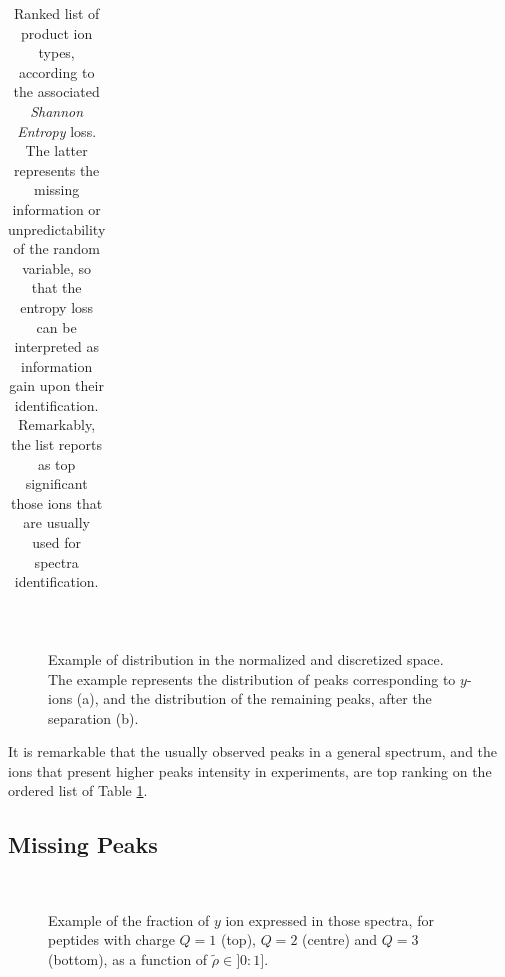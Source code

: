 \begin{table}
\begin{center}
\begin{tabular}{crlrlrl}
\hline \hline
\end{tabular}
\caption{\label{tab:list}
Ranked list of product ion types, according to the associated \emph{Shannon
Entropy} loss. The latter represents the missing information or unpredictability of
the random variable, so that the entropy loss can be interpreted as information gain upon their identification. 
Remarkably, the list reports as top significant those ions that are usually used for spectra identification.
}
\end{center}
\end{table}

\begin{figure}[!thb]
\begin{center}
\subfigure[matched]{
\resizebox{0.45\textwidth}{!}{\sffamily}}
\subfigure[unmatched]{
\resizebox{0.45\textwidth}{!}{\sffamily}}\\
\caption{\label{fig:dist-ex}
Example of distribution in the normalized and discretized space. The example represents
the distribution of peaks corresponding to $y$-ions (a), and the distribution of
the remaining peaks, after the separation (b).}
\end{center}
\end{figure}

It is remarkable that the usually observed peaks in a general spectrum, and the
ions that present higher peaks intensity in experiments, are top ranking on the
ordered list of Table \ref{tab:list}.

\subsection{Missing Peaks}

\begin{figure}[!thb]
\begin{center}
\ \\
\resizebox{0.6\textwidth}{!}{\sffamily}
\end{center}
\vskip -15pt
\caption{\label{fig:y-int-dist}
Example of the fraction of $y$ ion expressed in those spectra,
for peptides with charge $Q=1$ (top), $Q=2$ (centre) and $Q=3$ (bottom), as a
function of $\tilde\rho\in]0:1]$.}
\end{figure}



